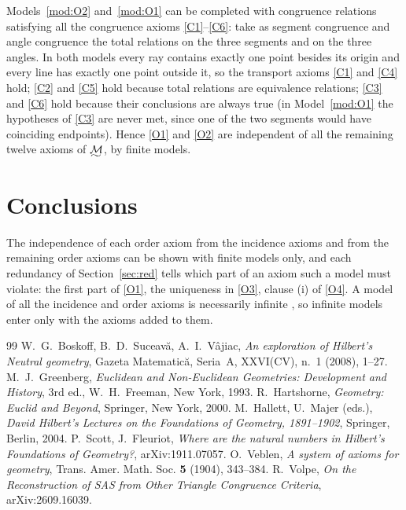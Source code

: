 \documentclass[11pt]{amsart}
\newcommand{\longsim}{\scalebox{1.3}[0.8]{\ensuremath{\sim}}}
\newcommand{\MG}{\underaccent{\longsim}{\mathcal{M}}}
\theoremstyle{definition}
\theoremstyle{remark}
\begin{document}
Models~\ref{mod:O2} and~\ref{mod:O1} can be completed with congruence relations satisfying all the congruence axioms \ref{C1}--\ref{C6}: take as segment congruence and angle congruence the total relations on the three segments and on the three angles. In both models every ray contains exactly one point besides its origin and every line has exactly one point outside it, so the transport axioms \ref{C1} and \ref{C4} hold; \ref{C2} and \ref{C5} hold because total relations are equivalence relations; \ref{C3} and \ref{C6} hold because their conclusions are always true (in Model~\ref{mod:O1} the hypotheses of \ref{C3} are never met, since one of the two segments would have coinciding endpoints). Hence \ref{O1} and \ref{O2} are independent of all the remaining twelve axioms of $\MG$, by finite models.


\section{Conclusions}\label{sec:concl}

The independence of each order axiom from the incidence axioms and from the remaining order axioms can be shown with finite models only, and each redundancy of Section~\ref{sec:red} tells which part of an axiom such a model must violate: the first part of \ref{O1}, the uniqueness in \ref{O3}, clause (i) of \ref{O4}. A model of all the incidence and order axioms is necessarily infinite \cite[Exercise~7.4]{Har}, so infinite models enter only with the axioms added to them.

\begin{thebibliography}{99}
 W.~G.~Boskoff, B.~D.~Suceav\u{a}, A.~I.~V\^{a}jiac, \emph{An exploration of Hilbert's Neutral geometry}, Gazeta Matematic\u{a}, Seria~A, XXVI(CV), n.~1 (2008), 1--27.
 M.~J.~Greenberg, \emph{Euclidean and Non-Euclidean Geometries: Development and History}, 3rd ed., W.~H.~Freeman, New York, 1993.
 R.~Hartshorne, \emph{Geometry: Euclid and Beyond}, Springer, New York, 2000.
 M.~Hallett, U.~Majer (eds.), \emph{David Hilbert's Lectures on the Foundations of Geometry, 1891--1902}, Springer, Berlin, 2004.
 P.~Scott, J.~Fleuriot, \emph{Where are the natural numbers in Hilbert's Foundations of Geometry?}, arXiv:1911.07057.
 O.~Veblen, \emph{A system of axioms for geometry}, Trans. Amer. Math. Soc. \textbf{5} (1904), 343--384.
 R.~Volpe, \emph{On the Reconstruction of SAS from Other Triangle Congruence Criteria}, arXiv:2609.16039.
\end{thebibliography}
\end{document}
